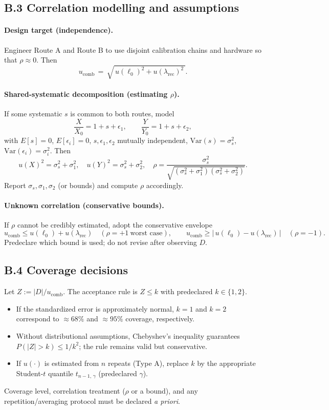 \documentclass[11pt]{article}
\theoremstyle{plain}
\theoremstyle{definition}
\theoremstyle{remark}
\begin{document}
\subsection*{B.3 Correlation modelling and assumptions}
\paragraph{Design target (independence).}
Engineer Route A and Route B to use disjoint calibration chains and hardware so that \(\rho\approx 0\). Then
\[
u_{\mathrm{comb}}\,=\,\sqrt{\,u(\ell_0)^2 + u(\lambda_{\mathrm{rec}})^2\,}.
\]

\paragraph{Shared-systematic decomposition (estimating \(\rho\)).}
If some systematic \(s\) is common to both routes, model
\[
\frac{X}{X_0}=1+s+\epsilon_1,\qquad
\frac{Y}{Y_0}=1+s+\epsilon_2,
\]
with \(E[s]=0\), \(E[\epsilon_i]=0\), \(s,\epsilon_1,\epsilon_2\) mutually independent, \(\mathrm{Var}(s)=\sigma_s^2\), \(\mathrm{Var}(\epsilon_i)=\sigma_i^2\).
Then
\[
u(X)^2=\sigma_s^2+\sigma_1^2,\quad
u(Y)^2=\sigma_s^2+\sigma_2^2,\quad
\rho=\frac{\sigma_s^2}{\sqrt{(\sigma_s^2+\sigma_1^2)(\sigma_s^2+\sigma_2^2)}}.
\]
Report \(\sigma_s,\sigma_1,\sigma_2\) (or bounds) and compute \(\rho\) accordingly.

\paragraph{Unknown correlation (conservative bounds).}
If \(\rho\) cannot be credibly estimated, adopt the conservative envelope
\[
u_{\mathrm{comb}} \le u(\ell_0)+u(\lambda_{\mathrm{rec}})\quad(\rho=+1\ \text{worst case}),\qquad
u_{\mathrm{comb}} \ge \big|\,u(\ell_0)-u(\lambda_{\mathrm{rec}})\,\big|\quad(\rho=-1).
\]
Predeclare which bound is used; do not revise after observing \(D\).

\subsection*{B.4 Coverage decisions}
Let \(Z:=|D|/u_{\mathrm{comb}}\). The acceptance rule is \(Z\le k\) with pre\-declared \(k\in\{1,2\}\).
\begin{itemize}
  \item If the standard\-ized error is approximately normal, \(k=1\) and \(k=2\) correspond to \(\approx68\%\) and \(\approx95\%\) coverage, respectively.
  \item Without distribu\-tional assumptions, Chebyshev’s inequality guarantees \(P(|Z|>k)\le 1/k^2\); the rule remains valid but conservative.
  \item If \(u(\cdot)\) is estimated from \(n\) repeats (Type A), replace \(k\) by the appropriate Student-\(t\) quantile \(t_{n-1,\,\gamma}\) (pre\-declared \(\gamma\)).
\end{itemize}
Coverage level, correla\-tion treatment (\(\rho\) or a bound), and any rep\-etition/averaging protocol must be declared \emph{a priori}.
\end{document}
